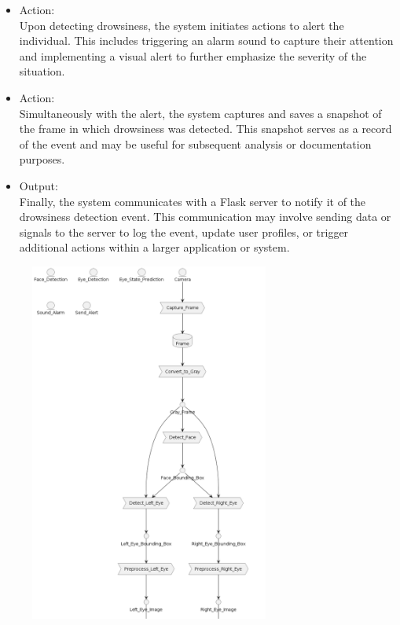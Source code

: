 \documentclass[12pt]{article}
\begin{document}
\begin{itemize}
\item Action:\\ Upon detecting drowsiness, the system initiates actions to alert the individual. This includes triggering an alarm sound to capture their attention and implementing a visual alert to further emphasize the severity of the situation.\\
\item Action:\\ Simultaneously with the alert, the system captures and saves a snapshot of the frame in which drowsiness was detected. This snapshot serves as a record of the event and may be useful for subsequent analysis or documentation purposes.\\
\item Output:\\ Finally, the system communicates with a Flask server to notify it of the drowsiness detection event. This communication may involve sending data or signals to the server to log the event, update user profiles, or trigger additional actions within a larger application or system.\\


\end{itemize}
\begin{figure}[h]
\centering
\includegraphics[width=0.7\textwidth]{dfda}
\end{figure}
\end{document}
